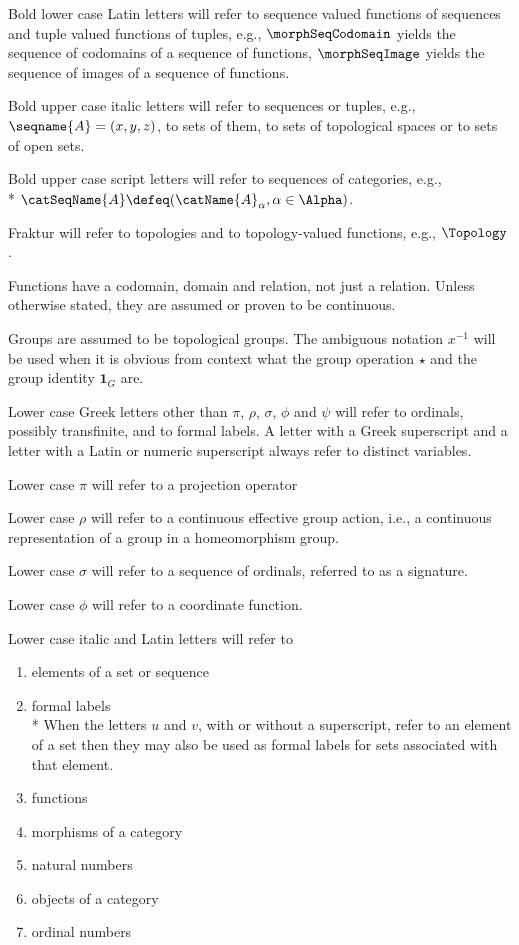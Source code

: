 \documentclass{article}
\begin{document}
Bold lower case Latin letters will refer to sequence valued functions of
sequences and tuple valued functions of tuples, e.g., $\morphSeqCodomain$ yields
the sequence of codomains of a sequence of functions, $\morphSeqImage$ yields
the sequence of images of a sequence of functions.

Bold upper case italic letters will refer to sequences or tuples, e.g.,
$\seqname{A}=(x,y,z)$, to sets of them, to sets of topological spaces or
to sets of open sets.

Bold upper case script letters will refer to
sequences of categories, e.g., \\*
\nobreaks
{{
  $\catSeqName{A} \defeq (\catName{A}_\alpha, \alpha \in \Alpha)$.
}}

Fraktur will refer to topologies and to topology-valued functions, e.g.,
$\Topology$.

Functions have a codomain, domain and relation, not just a relation. Unless
otherwise stated, they are assumed or proven to be continuous.

Groups are assumed to be topological groups. The ambiguous notation
$x^{-1}$ will be used when it is obvious from context what the group
operation $\star$ and the group identity $\mathbf{1}_G$ are.

Lower case Greek letters other than $\pi$, $\rho$, $\sigma$, $\phi$ and
$\psi$ will refer to ordinals, possibly transfinite, and to formal
labels.  A letter with a Greek superscript and a letter with a Latin or
numeric superscript always refer to distinct variables.

Lower case $\pi$ will refer to a projection operator

Lower case $\rho$ will refer to a continuous effective group action,
i.e., a continuous representation of a group in a homeomorphism group.

Lower case $\sigma$ will refer to a sequence of ordinals, referred to as
a signature.

Lower case $\phi$ will refer to a coordinate function.

Lower case italic and Latin letters will refer to
\begin{enumerate}
\item elements of a set or sequence
\item formal labels \\*
When the letters $u$ and $v$, with or without a superscript, refer to an
element of a set then they may also be used as formal labels for sets
associated with that element.
\item functions
\item morphisms of a category
\item natural numbers
\item objects of a category
\item ordinal numbers
\end{enumerate}
\end{document}
